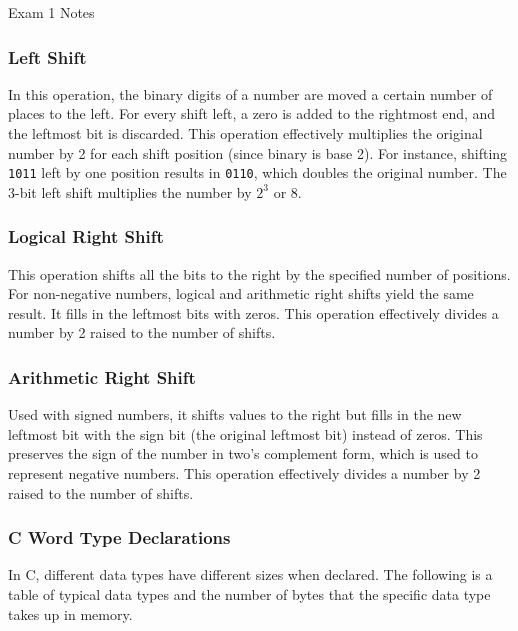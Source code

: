 \begin{examnotes}{Exam 1 Notes}
    \subsubsection*{Left Shift}

    In this operation, the binary digits of a number are moved a certain number of places to the left. For every shift left, a zero is added to the rightmost end, and the leftmost bit is discarded. 
    This operation effectively multiplies the original number by 2 for each shift position (since binary is base 2). For instance, shifting \texttt{1011} left by one position results in \texttt{0110}, 
    which doubles the original number. The 3-bit left shift multiplies the number by $2^{3}$ or 8.

    \subsubsection*{Logical Right Shift}

    This operation shifts all the bits to the right by the specified number of positions. For non-negative numbers, logical and arithmetic right shifts yield the same result. It fills in the leftmost 
    bits with zeros. This operation effectively divides a number by 2 raised to the number of shifts.

    \subsubsection*{Arithmetic Right Shift}

    Used with signed numbers, it shifts values to the right but fills in the new leftmost bit with the sign bit (the original leftmost bit) instead of zeros. This preserves the sign of the number in 
    two's complement form, which is used to represent negative numbers. This operation effectively divides a number by 2 raised to the number of shifts.

    \subsubsection*{C Word Type Declarations}

    In C, different data types have different sizes when declared. The following is a table of typical data types and the number of bytes that the specific data type takes up in memory.


\end{examnotes}
